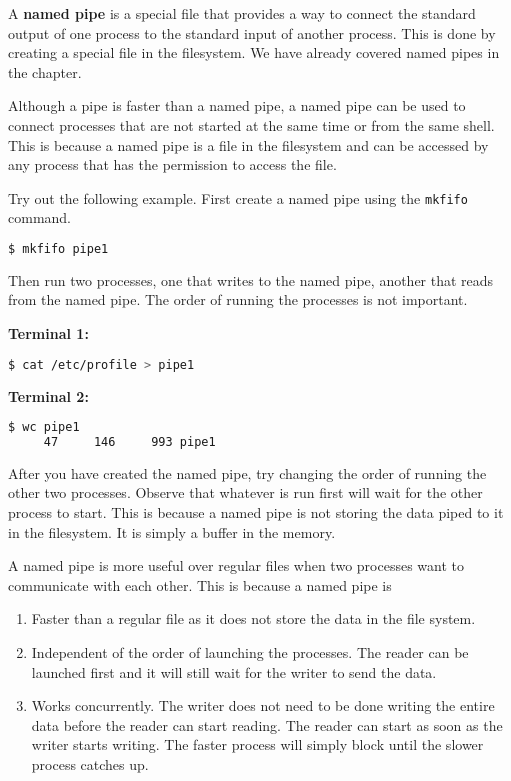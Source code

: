 A \textbf{named pipe} is a special file that provides a way to connect
the standard output of one process to the standard input of another
process. This is done by creating a special file in the filesystem.
We have already covered named pipes in the  chapter.

Although a pipe is faster than a named pipe, a named pipe can be used
to connect processes that are not started at the same time or from
the same shell. This is because a named pipe is a file in the filesystem
and can be accessed by any process that has the permission to access
the file.

Try out the following example. First create a named pipe using the
\lstinline|mkfifo| command.

\begin{lstlisting}[language=bash]
$ mkfifo pipe1
\end{lstlisting}

Then run two processes, one that writes to the named pipe, another
that reads from the named pipe. The order of running the processes
is not important.

\textbf{Terminal 1:}
\begin{lstlisting}[language=bash]
$ cat /etc/profile > pipe1
\end{lstlisting}

\textbf{Terminal 2:}
\begin{lstlisting}[language=bash]
$ wc pipe1
     47     146     993 pipe1
\end{lstlisting}

\begin{exercise}
  After you have created the named pipe,
  try changing the order of running the other two processes.
  Observe that whatever is run first will wait for
  the other process to start.
  This is because a named pipe is not storing the data piped to it
  in the filesystem. It is simply a buffer in the memory.
\end{exercise}

A named pipe is more useful over regular files when two processes
want to communicate with each other. This is because a named pipe
is

\begin{enumerate}
  \item Faster than a regular file as it does not store the data in
    the file system.
  \item Independent of the order of launching the processes.
    The reader can be launched first and it will still wait for
    the writer to send the data.
  \item Works concurrently. The writer does not need to be done
    writing the entire data before the reader can start reading.
    The reader can start as soon as the writer starts writing.
    The faster process will simply block until the slower process
    catches up.
\end{enumerate}

